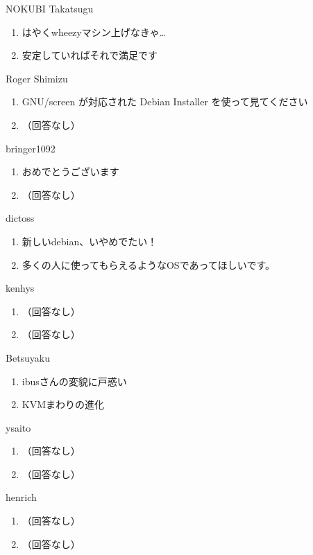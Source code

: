 \begin{prework}{ NOKUBI Takatsugu }
  \begin{enumerate}
  \item はやくwheezyマシン上げなきゃ…
  \item 安定していればそれで満足です
  \end{enumerate}
\end{prework}

\begin{prework}{ Roger Shimizu }
  \begin{enumerate}
  \item GNU/screen が対応された Debian Installer を使って見てください
  \item （回答なし）
  \end{enumerate}
\end{prework}

\begin{prework}{ bringer1092 }
  \begin{enumerate}
  \item おめでとうございます
  \item （回答なし）
  \end{enumerate}
\end{prework}

\begin{prework}{ dictoss }
  \begin{enumerate}
  \item 新しいdebian、いやめでたい！
  \item 多くの人に使ってもらえるようなOSであってほしいです。
  \end{enumerate}
\end{prework}

\begin{prework}{ kenhys }
  \begin{enumerate}
  \item （回答なし）
  \item （回答なし）
  \end{enumerate}
\end{prework}

\begin{prework}{ Betsuyaku }
  \begin{enumerate}
  \item ibusさんの変貌に戸惑い
  \item KVMまわりの進化
  \end{enumerate}
\end{prework}

\begin{prework}{ ysaito }
  \begin{enumerate}
  \item （回答なし）
  \item （回答なし）
  \end{enumerate}
\end{prework}

\begin{prework}{ henrich }
  \begin{enumerate}
  \item （回答なし）
  \item （回答なし）
  \end{enumerate}
\end{prework}
